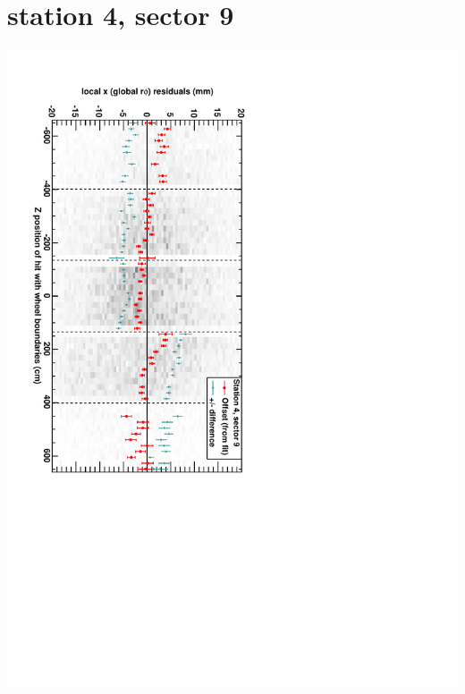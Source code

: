 \documentclass[compress]{beamer}
\begin{document}
\section*{station 4, sector 9}
\begin{frame} \vfill \mbox{\hspace{-1 cm}\includegraphics[height=1.2\linewidth, angle=90]{DTrphiVsZ_st4_sr09.pdf}} \end{frame}
\end{document}

